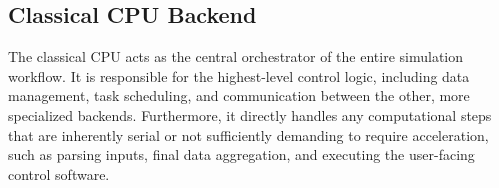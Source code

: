 \subsection{Classical CPU Backend}
The classical CPU acts as the central orchestrator of the entire simulation workflow. It is responsible for the highest-level control logic, including data management, task scheduling, and communication between the other, more specialized backends. Furthermore, it directly handles any computational steps that are inherently serial or not sufficiently demanding to require acceleration, such as parsing inputs, final data aggregation, and executing the user-facing control software.
